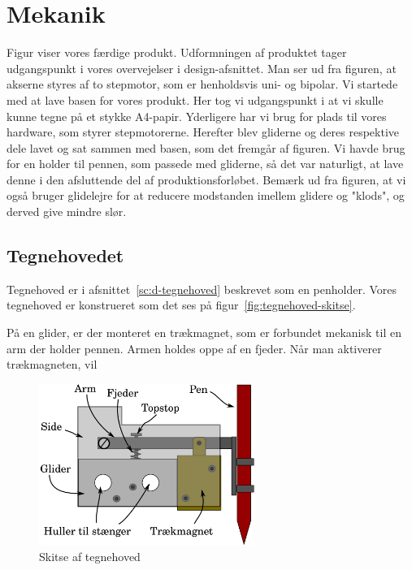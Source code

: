 \chapter[Implementering af mekanik]{Mekanik}


Figur  viser vores færdige produkt.
Udformningen af produktet tager udgangspunkt i vores overvejelser i design-afsnittet.
Man ser ud fra figuren, at akserne styres af to stepmotor, som er henholdsvis uni- og bipolar.
Vi startede med at lave basen for vores produkt. Her tog vi udgangspunkt i at vi skulle kunne
tegne på et stykke A4-papir. Yderligere har vi brug for plads til vores hardware, som styrer
stepmotorerne. Herefter blev gliderne og deres respektive dele lavet og sat sammen med basen,
som det fremgår af figuren. Vi havde brug for en holder til pennen, som passede med gliderne,
så det var naturligt, at lave denne i den afsluttende del af produktionsforløbet. Bemærk ud
fra figuren, at vi også bruger glidelejre for at reducere modstanden imellem glidere og "klods",
og derved give mindre slør.

\section{Tegnehovedet}
Tegnehoved er i afsnittet~\vref{sc:d-tegnehoved} beskrevet som en
penholder. Vores tegnehoved er konstrueret som det ses på
figur~\vref{fig:tegnehoved-skitse}.

På en glider, er der monteret en trækmagnet, som er forbundet mekanisk
til en arm der holder pennen. Armen holdes oppe af en fjeder. Når man aktiverer trækmagneten, vil 

\begin{figure}[htbp]
  \centering
  \includegraphics[width=7cm]{./img/tegnehoved-skitse}
  \caption{Skitse af tegnehoved}
  \label{fig:tegnehoved-skitse}
\end{figure}

